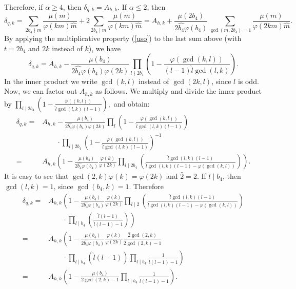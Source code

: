 \documentclass[twoside,final,reqno,noamsfonts]{birkartspecial}
\begin{document}
Therefore, if $\alpha\geq4$, then $\delta_{q,k}=A_{h,k}$.
If $\alpha\leq2$, then
$$\delta_{q,k}=\sum_{2b_4\nmid m}\frac{\mu(m)}{\varphi(km)\hat{m}}+
2\sum_{2b_4\mid m}\frac{\mu(m)}{\varphi(km)\hat{m}}
=A_{h,k}+\frac{\mu(2b_4)}{2\hat{b_4}\varphi(b_4)}\sum_{\gcd(m,2b_4)=1}\frac{\mu(m)}{\varphi(2km)\hat{m}}.$$
By applying the multiplicative property (\ref{uso}) to the
last sum above (with $t=2b_4$ and $2k$ instead of $k$), we have
$$\delta_{q,k}=A_{h,k}-\frac{\mu(b_4)}{2\hat{b_4}\varphi(b_4)\varphi(2k)}\prod_{l\nmid
  2b_4}\left(1-\frac{\varphi(\gcd(k,l))}
{(l-1)\hat{l} \gcd (l,k)}\right).$$
In the inner product we write  $\gcd(k,l)$ instead of $\gcd(2k,l)$, since $l$ is odd. Now,
we can factor out $A_{h,k}$ as follows. We multiply and divide the inner product by
 $\prod_{l\mid 2b_4}\left(1-\frac{\varphi((k,l))}{\hat{l} \gcd (l,k)(l-1)}\right)
,$
and  obtain:
$$
\begin{array}{rl}
\delta_{q,k}= & \displaystyle{
A_{h,k}-\frac{\mu(b_4)}{2\hat{b_4}\varphi(b_4)\varphi(2k)}
\prod_{l}\left(1-\frac{\varphi(\gcd(k,l))}{
\hat{l} \gcd (l,k)(l-1)}\right)}
\\
& \qquad \cdot \displaystyle
\prod_{l\mid 2b_4}{\left(1-\frac{\varphi(\gcd(k,l))}{\hat{l} \gcd (l,k)(l-1)}\right)^{-1}}
\\
=& \displaystyle{
A_{h,k}\left(1-\frac{\mu(b_4)}{2\hat{b_4}\varphi(b_4)}\frac{\varphi(k)}{\varphi(2k)}\prod_{l\mid 2b_4}
\left(\frac{\hat{l} \gcd (l,k)(l-1)}{
\hat{l} \gcd (l,k)(l-1)-\varphi( \gcd (k,l))}\right)\right)
}.
\end{array}
$$
It is easy to see that $\gcd(2,k)\varphi(k)=\varphi(2k)$ and $\hat{2}=2$.
 If $l\mid b_4$, then $\gcd(l,k)=1$, since $\gcd(b_4,k)=1$.
Therefore
$$
\begin{array}{rl}
\delta_{q,k}= & \displaystyle{
A_{h,k}\left(1-\frac{\mu(b_4)}{2\hat{b_4}\varphi(b_4)}\frac{\varphi(k)}{\varphi(2k)}
\prod_{l\mid 2}
\left(\frac{\hat{l} \gcd (l,k)(l-1)}{
\hat{l} \gcd (l,k)(l-1)-\varphi( \gcd (k,l))}\right)
\right.
}
\\
& \displaystyle {
\left. \qquad \cdot
\prod_{l\mid b_4}
\left(\frac{\hat{l}(l-1)}{
\hat{l}(l-1)- 1}\right)\right)
}
\\
= & \displaystyle{
A_{h,k}\left(1-\frac{\mu(b_4)}{2\hat{b_4}\varphi(b_4)}\frac{\varphi(k)}{\varphi(2k)}
\frac{\hat{2} \gcd (2,k)}{
\hat{2} \gcd (2,k)- 1}
\right.
}
\\
& \displaystyle {
\left. \qquad \cdot
\prod_{l\mid b_4}
\left({\hat{l}(l-1)}\right)
\prod_{l\mid b_4}\frac{1}
{\hat{l}(l-1)- 1}\right)
}
\\
= &\displaystyle{
A_{h,k}\left(1-\frac{\mu(b_4)}{2 \gcd (2,k)-1}\prod_{l\mid b_4}\frac{1}{\hat{l} (l-1)-1}\right).}
\end{array}$$
\end{document}
